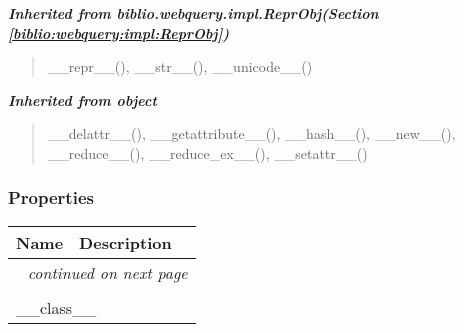 \large{\textbf{\textit{Inherited from biblio.webquery.impl.ReprObj\textit{(Section \ref{biblio:webquery:impl:ReprObj})}}}}

\begin{quote}
\_\_repr\_\_(), \_\_str\_\_(), \_\_unicode\_\_()
\end{quote}

\large{\textbf{\textit{Inherited from object}}}

\begin{quote}
\_\_delattr\_\_(), \_\_getattribute\_\_(), \_\_hash\_\_(), \_\_new\_\_(), \_\_reduce\_\_(), \_\_reduce\_ex\_\_(), \_\_setattr\_\_()
\end{quote}


  \subsubsection{Properties}

    \vspace{-1cm}
\hspace{\varindent}\begin{longtable}{|p{\varnamewidth}|p{\vardescrwidth}|l}
\cline{1-2}
\cline{1-2} \centering \textbf{Name} & \centering \textbf{Description}& \\
\cline{1-2}
\endhead\cline{1-2}\multicolumn{3}{r}{\small\textit{continued on next page}}\\\endfoot\cline{1-2}
\endlastfoot\multicolumn{2}{|l|}{\textit{Inherited from object}}\\
\multicolumn{2}{|p{\varwidth}|}{\raggedright \_\_class\_\_}\\
\cline{1-2}
\end{longtable}



